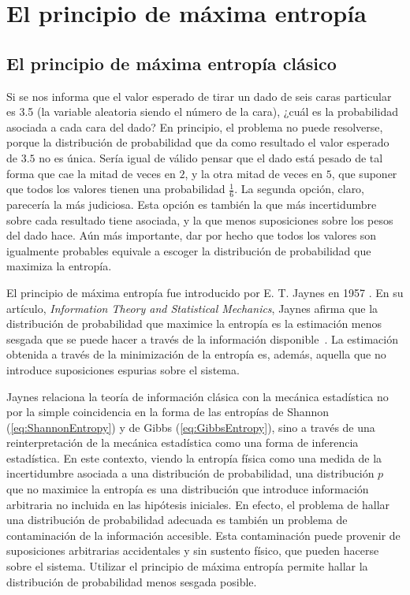 \section{El principio de máxima entropía}
\label{sec:ch2_maxent}



\subsection{El principio de máxima entropía clásico}

Si se nos informa que el valor esperado de tirar un dado de seis caras particular es 3.5 (la variable aleatoria siendo el número de la cara), ¿cuál es la probabilidad asociada a cada cara del dado? En principio, el problema no puede resolverse, porque la distribución de probabilidad que da como resultado el valor esperado de $3.5$ no es única. Sería igual de válido pensar que el dado está pesado de tal forma que cae la mitad de veces en $2$, y la otra mitad de veces en $5$, que suponer que todos los valores tienen una probabilidad $\frac{1}{6}$. La segunda opción, claro, parecería la más judiciosa. Esta opción es también la que más incertidumbre sobre cada resultado tiene asociada, y la que menos suposiciones sobre los pesos del dado hace. Aún más importante, dar por hecho que todos los valores son igualmente probables equivale a escoger la distribución de probabilidad que maximiza la entropía.


El principio de máxima entropía fue introducido por E. T. Jaynes en 1957 \cite{JaynesI}. En su artículo, \textit{Information Theory and Statistical Mechanics}, Jaynes afirma que la distribución de probabilidad que maximice la entropía es la estimación menos sesgada que se puede hacer a través de la información disponible~\cite{JaynesI}. La estimación obtenida a través de la minimización de la entropía es, además, aquella que no introduce suposiciones espurias sobre el sistema.

Jaynes relaciona la teoría de información clásica con la mecánica estadística no por la simple coincidencia en la forma de las entropías de Shannon (\ref{eq:ShannonEntropy}) y de Gibbs (\ref{eq:GibbsEntropy}), sino a través de una reinterpretación de la mecánica estadística como una forma de inferencia estadística. En este contexto, viendo la entropía física como una medida de la incertidumbre asociada a una distribución de probabilidad, una distribución $p$ que no maximice la entropía es una distribución que introduce información arbitraria no incluida en las hipótesis iniciales. En efecto, el problema de hallar una distribución de probabilidad adecuada es también un problema de contaminación de la información accesible. Esta contaminación puede provenir de suposiciones arbitrarias accidentales y sin sustento físico, que pueden hacerse sobre el sistema. Utilizar el principio de máxima entropía permite hallar la distribución de probabilidad menos sesgada posible.

